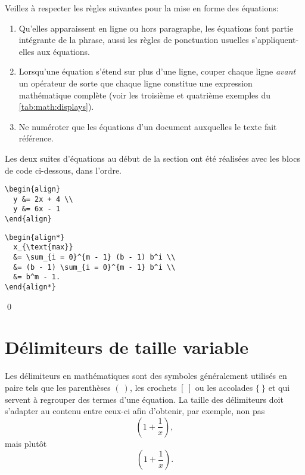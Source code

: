 \begin{conseil}
  Veillez à respecter les règles suivantes pour la mise en forme des
  équations:
  \begin{enumerate}
  \item Qu'elles apparaissent en ligne ou hors paragraphe, les
    équations font partie intégrante de la phrase, aussi les règles de
    ponctuation usuelles s'appliquent-elles aux équations.
  \item Lorsqu'une équation s'étend sur plus d'une ligne, couper
    chaque ligne \emph{avant} un opérateur de sorte que chaque ligne
    constitue une expression mathématique complète (voir les troisième
    et quatrième exemples du \autoref{tab:math:displays}).
  \item Ne numéroter que les équations d'un document auxquelles le
    texte fait référence.
  \end{enumerate}
\end{conseil}

\begin{exemple}
  Les deux suites d'équations au début de la section ont été réalisées
  avec les blocs de code ci-dessous, dans l'ordre.
\begin{lstlisting}
\begin{align}
  y &= 2x + 4 \\
  y &= 6x - 1
\end{align}
\end{lstlisting}
\begin{lstlisting}
\begin{align*}
  x_{\text{max}}
  &= \sum_{i = 0}^{m - 1} (b - 1) b^i \\
  &= (b - 1) \sum_{i = 0}^{m - 1} b^i \\
  &= b^m - 1.
\end{align*}
\end{lstlisting}
  \qed
\end{exemple}


\section{Délimiteurs de taille variable}
\label{sec:math:delimiteurs}

Les délimiteurs en mathématiques sont des symboles généralement
utilisés en paire tels que les parenthèses $(~)$, les crochets $[~]$
ou les accolades $\{~\}$ et qui servent à regrouper des termes d'une
équation. La taille des délimiteurs doit s'adapter au contenu entre
ceux-ci afin d'obtenir, par exemple, non pas
\begin{equation*}
  (1 + \frac{1}{x}),
\end{equation*}
mais plutôt
\begin{equation*}
  \left( 1 + \frac{1}{x} \right).
\end{equation*}

